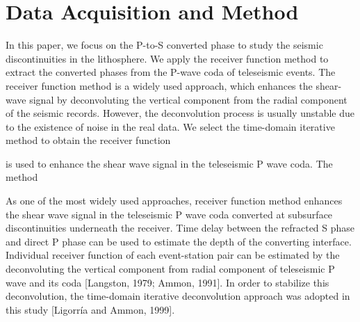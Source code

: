 \section{Data Acquisition and Method}

In this paper, we focus on the P-to-S converted phase to study the seismic discontinuities in the lithosphere. We apply the receiver function method \cite[e.g.][]{Langston_1979,ammon1991isolation} to extract the converted phases from the P-wave coda of teleseismic events. The receiver function method is a widely used approach, which enhances the shear-wave signal by deconvoluting the vertical component from the radial component of the seismic records. However, the deconvolution process is usually unstable due to the existence of noise in the real data. We select the time-domain iterative method to obtain the receiver function \cite{ligorria1999iterative}

is used to enhance the shear wave signal in the teleseismic P wave coda. The method 



As one of the most widely used approaches, receiver function method enhances the shear wave signal in the teleseismic P wave coda converted at subsurface discontinuities underneath the receiver. Time delay between the refracted S phase and direct P phase can be used to estimate the depth of the converting interface. 
Individual receiver function of each event-station pair can be estimated by the deconvoluting the vertical component from radial component of teleseismic P wave and its coda [Langston, 1979; Ammon, 1991]. In order to stabilize this deconvolution, the time-domain iterative deconvolution approach was adopted in this study [Ligorría and Ammon, 1999].


